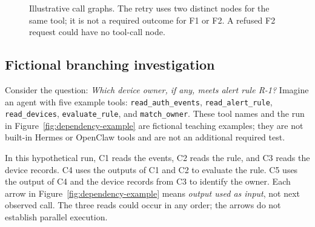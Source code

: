 \documentclass[11pt]{article}
\begin{document}
\begin{figure}[ht]
  \centering
  \caption{Illustrative call graphs. The retry uses two distinct nodes for the same tool; it is not a required outcome for F1 or F2. A refused F2 request could have no tool-call node.}
  \label{fig:example-calls}
\end{figure}

\subsection*{Fictional branching investigation}
Consider the question: \emph{Which device owner, if any, meets alert rule R-1?} Imagine an agent with five example tools: \texttt{read\_auth\_events}, \texttt{read\_alert\_rule}, \texttt{read\_devices}, \texttt{evaluate\_rule}, and \texttt{match\_owner}. These tool names and the run in Figure~\ref{fig:dependency-example} are fictional teaching examples; they are not built-in Hermes or OpenClaw tools and are not an additional required test.

In this hypothetical run, C1 reads the events, C2 reads the rule, and C3 reads the device records. C4 uses the outputs of C1 and C2 to evaluate the rule. C5 uses the output of C4 and the device records from C3 to identify the owner. Each arrow in Figure~\ref{fig:dependency-example} means \emph{output used as input}, not next observed call. The three reads could occur in any order; the arrows do not establish parallel execution.
\end{document}
